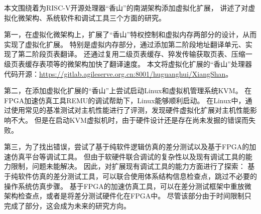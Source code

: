 \begin{conclusions}

本文围绕着为RISC-V开源处理器“香山”的南湖架构添加虚拟化扩展，
讲述了对虚拟化微架构、系统软件和调试工具三个方面的研究。

第一，在虚拟化微架构上，扩展了“香山”特权控制和虚拟内存两部分的设计，从而实现了虚拟化扩展。
特别是虚拟内存部分，通过添加第二阶段地址翻译单元、实现了第二阶段页表翻译。
还通过复用二级页表缓存、猝发传输获取页表、压缩一级页表缓存表项等的微架构加快了翻译速度。
本文将虚拟化扩展的“香山”处理器代码开源：\url{https://gitlab.agileserve.org.cn:8001/huguanghui/XiangShan}。

第二，在添加虚拟化扩展的“香山”上尝试启动Linux和虚拟机管理系统KVM。
在FPGA加速仿真工具REMU的调试帮助下，Linux能够顺利启动。
在Linux中，通过使用常见的基准测试对主机性能进行了评测，发现硬件虚拟化扩展对主机性能影响不大。
但是在启动KVM虚拟机时，由于硬件设计还是存在尚未发掘的错误而失败。

第三，为了找出错误，尝试了基于纯软件逻辑仿真的差分测试以及基于FPGA的加速仿真平台等调试工具。
但由于软硬件联合调试的复杂性以及现有调试工具的能力限制，问题未能解决。
因此，对扩展现有调试工具的能力方面进行了探索：
基于纯软件仿真的差分测试工具，可以联合使用体系结构信息检查点，跳过不必要的操作系统仿真步骤。
基于FPGA的加速仿真工具，可以在差分测试框架中重放微架构检查点，或者是将差分测试硬件化在FPGA中。
尽管该部分由于时间限制只完成了部分，这会成为未来的研究方向。

\end{conclusions}
